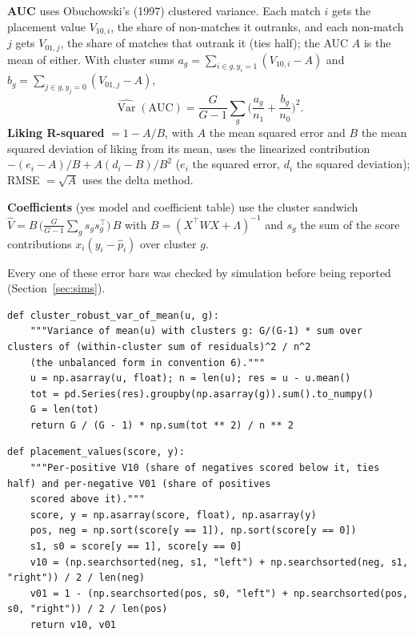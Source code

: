 \documentclass[11pt]{article}
\begin{document}
\textbf{AUC} uses Obuchowski's (1997) clustered variance. Each match $i$ gets the placement value $V_{10,i}$, the share
of non-matches it outranks, and each non-match $j$ gets $V_{01,j}$, the share of matches that outrank it (ties half);
the AUC $A$ is the mean of either. With cluster sums $a_g = \sum_{i \in g, y_i=1}(V_{10,i} - A)$ and
$b_g = \sum_{j \in g, y_j=0}(V_{01,j} - A)$,
\[
\widehat{\operatorname{Var}}(\text{AUC}) = \frac{G}{G-1}\sum_{g}\Big(\frac{a_g}{n_1} + \frac{b_g}{n_0}\Big)^2 .
\]
\textbf{Liking R-squared} $= 1 - A/B$, with $A$ the mean squared error and $B$ the mean squared deviation of liking
from its mean, uses the linearized contribution $-(e_i - A)/B + A(d_i - B)/B^2$ ($e_i$ the squared error, $d_i$ the
squared deviation); RMSE $= \sqrt A$ uses the delta method.

\textbf{Coefficients} (yes model and coefficient table) use the cluster sandwich
$\hat V = B\,\big(\tfrac{G}{G-1}\sum_g s_g s_g^\top\big)\,B$ with $B = (X^\top W X + \Lambda)^{-1}$ and $s_g$ the sum of
the score contributions $x_i(y_i - \hat p_i)$ over cluster $g$.

Every one of these error bars was checked by simulation before being reported (Section~\ref{sec:sims}).

\begin{lstlisting}[caption={Cluster-robust variance of a mean (convention 6) (scripts/modeling.py)}]
def cluster_robust_var_of_mean(u, g):
    """Variance of mean(u) with clusters g: G/(G-1) * sum over clusters of (within-cluster sum of residuals)^2 / n^2
    (the unbalanced form in convention 6)."""
    u = np.asarray(u, float); n = len(u); res = u - u.mean()
    tot = pd.Series(res).groupby(np.asarray(g)).sum().to_numpy()
    G = len(tot)
    return G / (G - 1) * np.sum(tot ** 2) / n ** 2
\end{lstlisting}

\begin{lstlisting}[caption={Placement values (scripts/modeling.py)}]
def placement_values(score, y):
    """Per-positive V10 (share of negatives scored below it, ties half) and per-negative V01 (share of positives
    scored above it)."""
    score, y = np.asarray(score, float), np.asarray(y)
    pos, neg = np.sort(score[y == 1]), np.sort(score[y == 0])
    s1, s0 = score[y == 1], score[y == 0]
    v10 = (np.searchsorted(neg, s1, "left") + np.searchsorted(neg, s1, "right")) / 2 / len(neg)
    v01 = 1 - (np.searchsorted(pos, s0, "left") + np.searchsorted(pos, s0, "right")) / 2 / len(pos)
    return v10, v01
\end{lstlisting}
\end{document}
